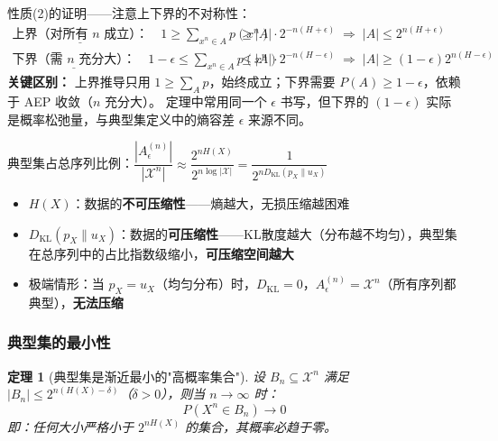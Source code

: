\documentclass[12pt,a4paper]{ctexart}
\newtheorem{theorem}{定理}[section]
\theoremstyle{definition}
\newcommand{\XX}{\mathcal{X}}
\newcommand{\DKL}{D_{\mathrm{KL}}}
\begin{document}
\begin{proofbox}
性质(2)的证明——注意上下界的不对称性：
\begin{align*}
\underline{\text{上界（对所有 }n\text{ 成立）：}}\quad
1 \geq \sum_{x^n \in A} p(x^n) &\geq |A| \cdot 2^{-n(H+\epsilon)}
\;\Rightarrow\; |A| \leq 2^{n(H+\epsilon)} \\[4pt]
\underline{\text{下界（需 }n\text{ 充分大）：}}\quad
1-\epsilon \leq \sum_{x^n \in A} p(x^n) &\leq |A| \cdot 2^{-n(H-\epsilon)}
\;\Rightarrow\; |A| \geq (1-\epsilon)2^{n(H-\epsilon)}
\end{align*}
\textbf{关键区别：} 上界推导只用 $1 \geq \sum_A p$，始终成立；下界需要 $P(A) \geq 1-\epsilon$，依赖于 AEP 收敛（$n$ 充分大）。
定理中常用同一个 $\epsilon$ 书写，但下界的 $(1-\epsilon)$ 实际是概率松弛量，与典型集定义中的熵容差 $\epsilon$ 来源不同。
\end{proofbox}

典型集占总序列比例：$\dfrac{|A_\epsilon^{(n)}|}{|\XX^n|} \approx \dfrac{2^{nH(X)}}{2^{n\log|\XX|}} = \dfrac{1}{2^{n \DKL(p_X\|u_X)}}$

\begin{keybox}[$\DKL(p\|u)$ 的直观含义]
\begin{itemize}[nosep]
  \item $H(X)$：数据的\textbf{不可压缩性}——熵越大，无损压缩越困难
  \item $\DKL(p_X\|u_X)$：数据的\textbf{可压缩性}——KL散度越大（分布越不均匀），典型集在总序列中的占比指数级缩小，\textbf{可压缩空间越大}
  \item 极端情形：当 $p_X = u_X$（均匀分布）时，$\DKL=0$，$A_\epsilon^{(n)} = \XX^n$（所有序列都典型），\textbf{无法压缩}
\end{itemize}
\end{keybox}

\subsubsection{典型集的最小性}

\begin{theorem}[典型集是渐近最小的"高概率集合"]
设 $B_n \subseteq \XX^n$ 满足 $|B_n| \leq 2^{n(H(X)-\delta)}$（$\delta > 0$），则当 $n \to \infty$ 时：
\[
P(X^n \in B_n) \to 0
\]
即：任何大小严格小于 $2^{nH(X)}$ 的集合，其概率必趋于零。
\end{theorem}
\end{document}
